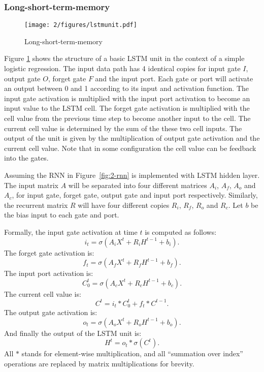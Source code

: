 \subsubsection{Long-short-term-memory}
\begin{figure}[htb]
\centering
\texttt{[image: 2/figures/lstmunit.pdf]}
\caption{Long-short-term-memory}
\label{fig:2-lstmunit}
\end{figure}
Figure \ref{fig:2-lstmunit} shows the structure of a basic LSTM unit\cite{graves2012supervised} in the context of a simple logistic regression. The input data path has 4 identical copies for input gate $I$, output gate $O$, forget gate $F$ and the input port. Each gate or port will activate an output between 0 and 1 according to its input and activation function. The input gate activation is multiplied with the input port activation to become an input value to the LSTM cell. The forget gate activation is multiplied with the cell value from the previous time step to become another input to the cell. The current cell value is determined by the sum of the these two cell inputs. The output of the unit is given by the multiplication of output gate activation and the current cell value. Note that in some configuration the cell value can be feedback into the gates.

Assuming the RNN in Figure~\ref{fig:2-rnn} is implemented with LSTM hidden layer. The input matrix $A$ will be separated into four different matrices $A_i$, $A_f$, $A_o$ and $A_c$, for input gate, forget gate, output gate and input port respectively. Similarly, the recurrent matrix $R$ will have four different copies $R_i$, $R_f$, $R_o$ and $R_c$. Let $b$ be the bias input to each gate and port.

Formally, the input gate activation at time $t$ is computed as follows:
\begin{equation}
i_t = \sigma(A_iX^t + R_iH^{t-1}+b_i).
\end{equation}
The forget gate activation is:
\begin{equation}
f_t = \sigma(A_fX^t + R_fH^{t-1}+b_f).
\end{equation}
The input port activation is:
\begin{equation}
C^t_0 = \sigma(A_cX^t + R_cH^{t-1}+b_c).
\end{equation}
The current cell value is:
\begin{equation}
C^t = i_t*C^t_0 + f_t*C^{t-1}.
\end{equation}
The output gate activation is:
\begin{equation}
o_t = \sigma(A_oX^t + R_oH^{t-1}+b_o).
\end{equation}
And finally the output of the LSTM unit is:
\begin{equation}
H^t = o_t*\sigma(C^t).
\end{equation}
All $*$ stands for element-wise multiplication, and all ``summation over index'' operations are replaced by matrix multiplications for brevity. 

